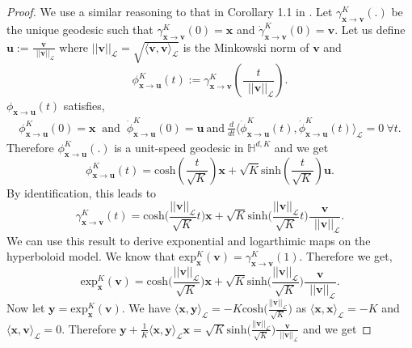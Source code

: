\documentclass{article}
\begin{document}
\logexp*
\begin{proof}
We use a similar reasoning to that in Corollary 1.1 in \cite{ganea2018hyperbolic}.
Let $\gamma^K_{\mathbf{x}\rightarrow\mathbf{v}}(.)$ be the unique geodesic such that $\gamma^K_{\mathbf{x}\rightarrow\mathbf{v}}(0)=\mathbf{x}$ and $\dot{\gamma}^K_{\mathbf{x}\rightarrow\mathbf{v}}(0)=\mathbf{v}$.
Let us define $\mathbf{u}:=\frac{\mathbf{v}}{\ \ ||\mathbf{v}||_\mathcal{L}}$ where $||\mathbf{v}||_\mathcal{L}=\sqrt{\langle\mathbf{v},\mathbf{v}\rangle_\mathcal{L}}$ is the Minkowski norm of $\mathbf{v}$
and $$\phi^K_{\mathbf{x}\rightarrow\mathbf{u}}(t):=\gamma^K_{\mathbf{x}\rightarrow\mathbf{v}}\left(\frac{t}{\ \ ||\mathbf{v}||_\mathcal{L}}\right).$$
$\phi_{\mathbf{x}\rightarrow\mathbf{u}}(t)$ satisfies,
\begin{align*}
\phi^K_{\mathbf{x}\rightarrow\mathbf{u}}(0)=\mathbf{x} \ \text{ and }\ \dot{\phi}^K_{\mathbf{x}\rightarrow\mathbf{u}}(0)=\mathbf{u} \ \text{and}\ 
\frac{d}{dt}\langle\dot{\phi}^K_{\mathbf{x}\rightarrow\mathbf{u}}(t),\dot{\phi}^K_{\mathbf{x}\rightarrow\mathbf{u}}(t)\rangle_\mathcal{L}=0 \ \forall t.
\end{align*}
Therefore $\phi^K_{\mathbf{x}\rightarrow\mathbf{u}}(.)$ is a unit-speed geodesic in $\mathbb{H}^{d,K}$ and we get
$$\phi^K_{\mathbf{x}\rightarrow\mathbf{u}}(t)=\mathrm{cosh}(\frac{t}{\sqrt{K}})\mathbf{x}+\sqrt{K}\mathrm{sinh}(\frac{t}{\sqrt{K}})\mathbf{u}.$$
By identification, this leads to 
$$\gamma^K_{\mathbf{x}\rightarrow\mathbf{v}}(t)=\mathrm{cosh}\bigg(\frac{||\mathbf{v}||_\mathcal{L}}{\sqrt{K}}t\bigg)\mathbf{x}+\sqrt{K}\mathrm{sinh}\bigg(\frac{||\mathbf{v}||_\mathcal{L}}{\sqrt{K}}t\bigg)\frac{\mathbf{v}}{\ \ ||\mathbf{v}||_\mathcal{L}}.$$
We can use this result to derive exponential and logarthimic maps on the hyperboloid model.
We know that $\mathrm{exp}^K_\mathbf{x}(\mathbf{v})=\gamma^K_{\mathbf{x}\rightarrow\mathbf{v}}(1)$. 
Therefore we get,
$$\mathrm{exp}^K_\mathbf{x}(\mathbf{v})=\mathrm{cosh}\bigg(\frac{||\mathbf{v}||_\mathcal{L}}{\sqrt{K}}\bigg)\mathbf{x}+\sqrt{K}\mathrm{sinh}\bigg(\frac{||\mathbf{v}||_\mathcal{L}}{\sqrt{K}}\bigg)\frac{\mathbf{v}}{\ \ ||\mathbf{v}||_\mathcal{L}}.$$
Now let $\mathbf{y}=\mathrm{exp}^K_\mathbf{x}(\mathbf{v})$.
We have $\langle\mathbf{x},\mathbf{y}\rangle_\mathcal{L}=-K\mathrm{cosh}\bigg(\frac{||\mathbf{v}||_\mathcal{L}}{\sqrt{K}}\bigg)$ as $\langle\mathbf{x},\mathbf{x}\rangle_\mathcal{L}=-K$ 
and $\langle\mathbf{x},\mathbf{v}\rangle_\mathcal{L}=0$.
Therefore $\mathbf{y}+\frac{1}{K}\langle\mathbf{x},\mathbf{y}\rangle_\mathcal{L}\mathbf{x}=\sqrt{K}\mathrm{sinh}\bigg(\frac{||\mathbf{v}||_\mathcal{L}}{\sqrt{K}}\bigg)\frac{\mathbf{v}}{\ \ ||\mathbf{v}||_\mathcal{L}}$ and we get

\end{proof}
\end{document}
